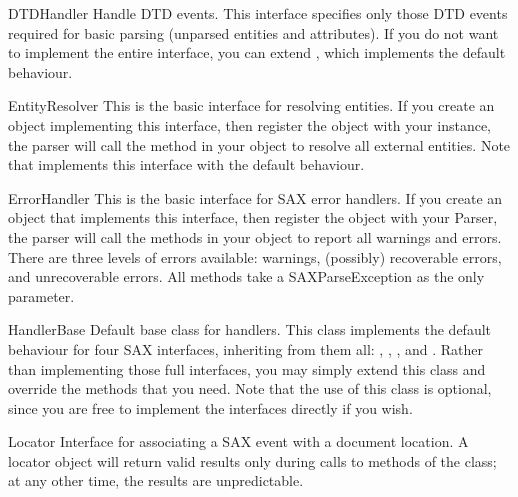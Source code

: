 \documentclass{howto}
\begin{document}
\begin{classdesc}{DTDHandler}{}
Handle DTD events. This interface specifies only those DTD
    events required for basic parsing (unparsed entities and
    attributes). If you do not want to implement the entire interface,
    you can extend , which implements the default
    behaviour.
\end{classdesc}

\begin{classdesc}{EntityResolver}{}
This is the basic interface for resolving entities. If you create an object
    implementing this interface, then register the object with your
     instance, the parser will call the method in your object to
    resolve all external entities. Note that  implements
    this interface with the default behaviour.
\end{classdesc}

\begin{classdesc}{ErrorHandler}{}
This is the basic interface for SAX error handlers. If you create an object
    that implements this interface, then register the object with your
    Parser, the parser will call the methods in your object to report
    all warnings and errors. There are three levels of errors
    available: warnings, (possibly) recoverable errors, and
    unrecoverable errors. All methods take a SAXParseException as the
    only parameter.
\end{classdesc}

\begin{classdesc}{HandlerBase}{}
Default base class for handlers. This class implements the default
    behaviour for four SAX interfaces, inheriting from them all:
    , ,
    , and .  Rather than
    implementing those full interfaces, you may simply extend this
    class and override the methods that you need. Note that the use of
    this class is optional, since you are free to implement the
    interfaces directly if you wish.
\end{classdesc}

\begin{classdesc}{Locator}{}
Interface for associating a SAX event with a document
location. A locator object will return valid results only during
calls to methods of the  class; 
at any other time, the results are unpredictable.
\end{classdesc}
\end{document}
